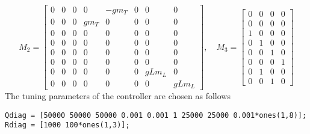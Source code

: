 \begin{equation}\label{key}
M_2 =
\begin{bmatrix}
0&0&0&0&-gm_T&0&0&0\\%
0&0&0&gm_T&0&0&0&0\\%
0&0&0&0&0&0&0&0\\%
0&0&0&0&0&0&0&0\\%
0&0&0&0&0&0&0&0\\%
0&0&0&0&0&0&0&0\\%
0&0&0&0&0&0&gLm_L&0\\%
0&0&0&0&0&0&0&gLm_L%
\end{bmatrix}, \quad
M_3  =
\begin{bmatrix}
0&0&0&0\\%
0&0&0&0\\%
1&0&0&0\\%
0&1&0&0\\%
0&0&1&0\\%
0&0&0&1\\%
0&1&0&0\\%
0&0&1&0%
\end{bmatrix}
\end{equation}
\newpage
The tuning parameters of the  controller are chosen as follows
\begin{lstlisting}
Qdiag = [50000 50000 50000 0.001 0.001 1 25000 25000 0.001*ones(1,8)];
Rdiag = [1000 100*ones(1,3)];
\end{lstlisting}

